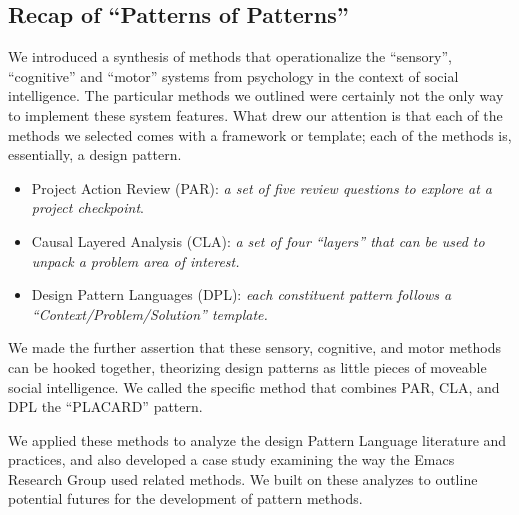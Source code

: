 \documentclass[acmlarge,timestamp]{acmart}
\begin{document}
\subsection{Recap of “Patterns of Patterns”}
\label{sec:org7c32ecc}

We introduced a synthesis of methods that operationalize the
“sensory”, “cognitive” and “motor” systems from psychology in the context of social intelligence.  The particular methods we outlined were certainly not the only way to implement these system features.  What drew our attention is that each of the methods we selected comes with a framework or template; each of the methods is, essentially, a design pattern.

\begin{itemize}
\item Project Action Review (PAR): \emph{a set of five review questions to explore at a project checkpoint}.
\item Causal Layered Analysis (CLA): \emph{a set of four “layers” that can
be used to unpack a problem area of interest.}
\item Design Pattern Languages (DPL): \emph{each constituent pattern follows a “Context/Problem/Solution” template.}
\end{itemize}

We made the further assertion that these sensory, cognitive, and motor
methods can be hooked together, theorizing design patterns as little
pieces of moveable social intelligence.  We called the specific method
that combines PAR, CLA, and DPL the “PLACARD” pattern.

We applied these methods to analyze the design Pattern Language
literature and practices, and also developed a case study examining
the way the Emacs Research Group used related methods.  We built on
these analyzes to outline potential futures for the development of
pattern methods.
\end{document}
